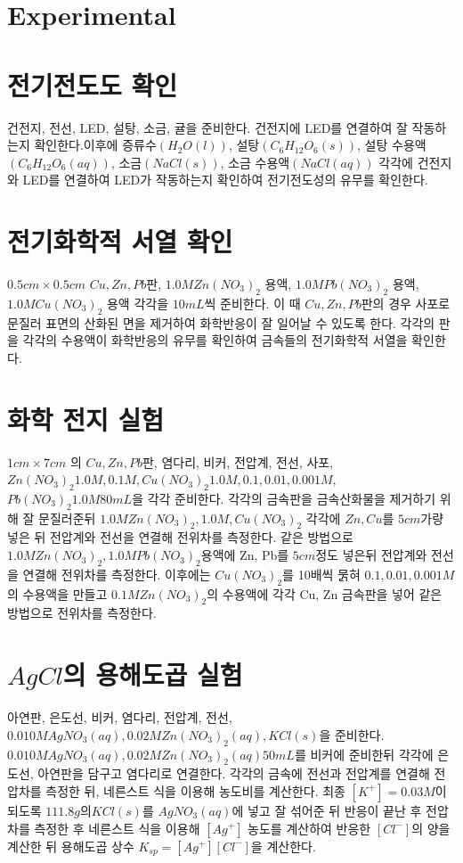 \documentclass[%
 reprint,
 amsmath,amssymb,
 aps,
]{revtex4-2}
\begin{document}
\section{\label{sec:level1}Experimental}
\section{\label{sec:level2}전기전도도 확인}
건전지, 전선, LED, 설탕, 소금, 귤을 준비한다. 건전지에 LED를 연결하여 잘 작동하는지 확인한다.이후에 증류수$(H_{2}O(l))$, 설탕$(C_{6}H_{12}O_{6}(s))$, 설탕 수용액$(C_{6}H_{12}O_{6}(aq))$, 소금$(NaCl(s))$, 소금 수용액$(NaCl(aq))$ 각각에 건전지와 LED를 연결하여 LED가 작동하는지 확인하여 전기전도성의 유무를 확인한다.
\section{\label{sec:level2}전기화학적 서열 확인}
$0.5cm \times 0.5cm $ $ Cu, Zn, Pb $판, $1.0M Zn(NO_{3})_{2}$ 용액, $1.0M Pb(NO_{3})_{2}$ 용액, $1.0M Cu(NO_{3})_{2}$ 용액 각각을 $10mL$씩 준비한다. 이 때 $Cu, Zn, Pb $판의 경우 사포로 문질러 표면의 산화된 면을 제거하여 화학반응이 잘 일어날 수 있도록 한다. 각각의 판을 각각의 수용액이 화학반응의 유무를 확인하여 금속들의 전기화학적 서열을 확인한다.
\section{\label{sec:level2}화학 전지 실험}
$1cm \times 7cm$ 의 $Cu, Zn, Pb $판, 염다리, 비커, 전압계, 전선, 사포, $Zn(NO_{3})_{2} 1.0M, 0.1M, Cu(NO_{3})_{2} 1.0M, 0.1, 0.01, 0.001M$, $Pb(NO_{3})_{2} 1.0M 80mL$을 각각 준비한다. 각각의 금속판을 금속산화물을 제거하기 위해 잘 문질러준뒤 $1.0M Zn(NO_{3})_{2}, 1.0M, Cu(NO_{3})_{2}$ 각각에 $Zn, Cu$를 $5cm$가량 넣은 뒤 전압계와 전선을 연결해 전위차를 측정한다. 같은 방법으로 $1.0M Zn(NO_{3})_{2}, 1.0M Pb(NO_{3})_{2}$용액에 Zn, Pb를 $5cm$정도 넣은뒤 전압계와 전선을 연결해 전위차를 측정한다. 이후에는 $Cu(NO_{3})_{2}$를 10배씩 묽혀 $0.1, 0.01, 0.001M$의 수용액을 만들고 $0.1M Zn(NO_{3})_{2}$의 수용액에 각각 Cu, Zn 금속판을 넣어 같은 방법으로 전위차를 측정한다. 
\section{\label{sec:level2}$AgCl$의 용해도곱 실험}
아연판, 은도선, 비커, 염다리, 전압계, 전선, $0.010M AgNO_{3}(aq), 0.02M Zn(NO_{3})_{2}(aq), KCl(s)$을 준비한다. $0.010M AgNO_{3}(aq), 0.02M Zn(NO_{3})_{2}(aq) 50mL$를 비커에 준비한뒤 각각에 은도선, 아연판을 담구고 염다리로 연결한다. 각각의 금속에 전선과 전압계를 연결해 전압차를 측정한 뒤, 네른스트 식을 이용해 농도비를 계산한다. 최종 $[K^{+}]=0.03M$이 되도록 $111.8g$의$ KCl(s)$를 $AgNO_{3}(aq)$에 넣고 잘 섞어준 뒤 반응이 끝난 후 전압차를 측정한 후 네른스트 식을 이용해 $[Ag^{+}]$ 농도를 계산하여 반응한 $[Cl^{-}]$의 양을 계산한 뒤 용해도곱 상수 $K_{sp} = [Ag^{+}][Cl^{-}]$을 계산한다.
\end{document}

